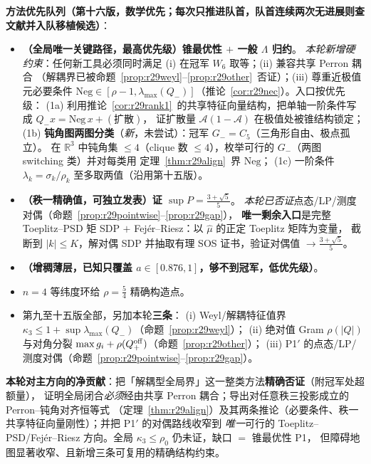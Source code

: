 \documentclass[UTF8,11pt]{ctexart}
\theoremstyle{definition}
\newcommand{\Lam}{\Lambda}
\newcommand{\R}{\mathbb{R}}
\begin{document}
\textbf{方法优先队列（第十六版，数学优先；每次只推进队首，队首连续两次无进展则查文献并入队移植候选）}：
\begin{itemize}[label={},leftmargin=1.4em,itemsep=2pt]
\item[\textbf{P1}]\textbf{（全局唯一关键路径，最高优先级）锥最优性 $+$ 一般 $\Lam$ 归约}。
\emph{本轮新增硬约束}：任何新工具必须同时满足 (i) 在冠军 $W_6$ 取等；(ii) 兼容共享 Perron 耦合
（解耦界已被命题~\ref{prop:r29weyl}--\ref{prop:r29other}~否证）；(iii) 尊重近极值元必要条件
$\mathrm{Neg}\in[\rho-1,\lambda_{\max}(Q_-)]$（推论~\ref{cor:r29nec}）。入口按优先级：
(1a) 利用推论~\ref{cor:r29rank1}~的共享特征向量结构，把单轴一阶条件写成 $Q_-x=\mathrm{Neg}\,x+(\text{扩散})$，
证扩散量 $\mathcal A(1-\mathcal A)$ 在极值处被锥结构锁定；
(1b) \textbf{钝角图两图分类}（\emph{新}，未尝试）：冠军 $G_-=C_5$（三角形自由、极点孤立）。
在 $\R^3$ 中钝角集 $\le4$（clique 数 $\le4$），枚举可行的 $G_-$（两图 switching 类）并对每类用
定理~\ref{thm:r29align}~界 $\mathrm{Neg}$；
(1c) 一阶条件 $\lambda_k=\sigma_k/\rho_k$ 至多取两值（沿用第十五版）。
\item[\textbf{P1$'$}]\textbf{（秩一精确值，可独立发表）证 $\sup P=\frac{3+\sqrt5}5$}。
\emph{本轮已否证}点态/LP/测度对偶（命题~\ref{prop:r29pointwise}--\ref{prop:r29gap}），
\textbf{唯一剩余入口}是完整 Toeplitz--PSD 矩 SDP $+$ Fejér--Riesz：以 $\widehat\mu$ 的正定 Toeplitz 矩阵为变量，
截断到 $|k|\le K$，解对偶 SDP 并抽取有理 SOS 证书，验证对偶值 $\to\frac{3+\sqrt5}5$。
\item[\textbf{P2}]\textbf{（增稠薄层，已知只覆盖 $a\in[0.876,1]$，够不到冠军，低优先级）}。
\item[\textbf{副（下界）}]$n=4$ 等纬度环给 $\rho=\frac54$ 精确构造点。
\item[\textbf{已弹出（累积，禁止再试）}]第九至十五版全部，另加本轮\textbf{三条}：
(i) Weyl/解耦特征值界 $\kappa_3\le1+\sup\lambda_{\max}(Q_-)$（命题~\ref{prop:r29weyl}）；
(ii) 绝对值 Gram $\rho(|Q|)$ 与对角分裂 $\max g_i+\rho(Q_+^{\rm off})$（命题~\ref{prop:r29other}）；
(iii) P1$'$ 的点态/LP/测度对偶（命题~\ref{prop:r29pointwise}--\ref{prop:r29gap}）。
\end{itemize}

\textbf{本轮对主方向的净贡献}：把「解耦型全局界」这一整类方法\textbf{精确否证}（附冠军处超额量），
证明全局闭合\emph{必须}经由共享 Perron 耦合；导出对任意秩三投影成立的 Perron--钝角对齐恒等式
（定理~\ref{thm:r29align}）及其两条推论（必要条件、秩一共享特征向量刚性）；并把 P1$'$ 的对偶路线收窄到
\emph{唯一}可行的 Toeplitz--PSD/Fejér--Riesz 方向。全局 $\kappa_3\le\rho_0$ 仍未证，缺口 $=$ 锥最优性 P1，
但障碍地图显著收窄、且新增三条可复用的精确结构约束。
\end{document}
